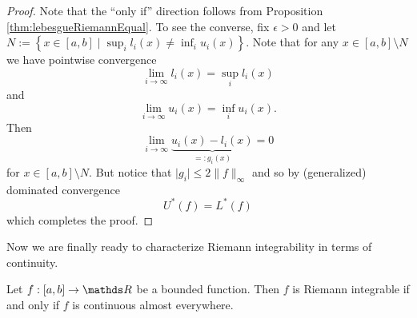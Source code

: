 \begin{proof}
Note that the ``only if'' direction follows from Proposition \ref{thm:lebesgueRiemannEqual}.
To see the converse, fix $\epsilon>0$ and let $N:=\left\{ x\in\left[a,b\right]\mid\sup_{i}l_{i}\left(x\right)\neq\inf_{i}u_{i}\left(x\right)\right\} $.
Note that for any $x\in[a,b]\setminus N$ we have pointwise convergence
\[
\lim_{i\to\infty}l_{i}\left(x\right)=\sup_{i}l_{i}\left(x\right)
\]
and
\[
\lim_{i\to\infty}u_{i}\left(x\right)=\inf_{i}u_{i}\left(x\right).
\]
Then 
\[
\lim_{i\to\infty}\underbrace{u_{i}\left(x\right)-l_{i}\left(x\right)}_{=:g_{i}\left(x\right)}=0
\]
for $x\in\left[a,b\right]\setminus N$. But notice that $\lvert g_{i}\rvert\leq2\lVert f\rVert_{\infty}$
and so by (generalized) dominated convergence
\[
U^{*}\left(f\right)=L^{*}\left(f\right)
\]
which completes the proof.
\end{proof}
Now we are finally ready to characterize Riemann integrability in
terms of continuity.
\begin{thm}
\label{thm:riemannIntegrableAEContinuous}Let $f:\left[a,b\right]\to\R$
be a bounded function. Then $f$ is Riemann integrable if and only
if $f$ is continuous almost everywhere.
\end{thm}

